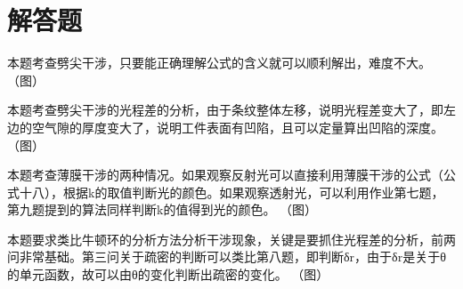 \section{解答题}
\exercise 

\solve
本题考查劈尖干涉，只要能正确理解公式的含义就可以顺利解出，难度不大。
（图）

\exercise 

\solve
本题考查劈尖干涉的光程差的分析，由于条纹整体左移，说明光程差变大了，即左边的空气隙的厚度变大了，说明工件表面有凹陷，且可以定量算出凹陷的深度。
（图）

\exercise 

\solve
本题考查薄膜干涉的两种情况。如果观察反射光可以直接利用薄膜干涉的公式（公式十八），根据k的取值判断光的颜色。如果观察透射光，可以利用作业第七题，第九题提到的算法同样判断k的值得到光的颜色。
（图）

\exercise 

\solve
本题要求类比牛顿环的分析方法分析干涉现象，关键是要抓住光程差的分析，前两问非常基础。第三问关于疏密的判断可以类比第八题，即判断δr，由于δr是关于θ的单元函数，故可以由θ的变化判断出疏密的变化。
（图）

